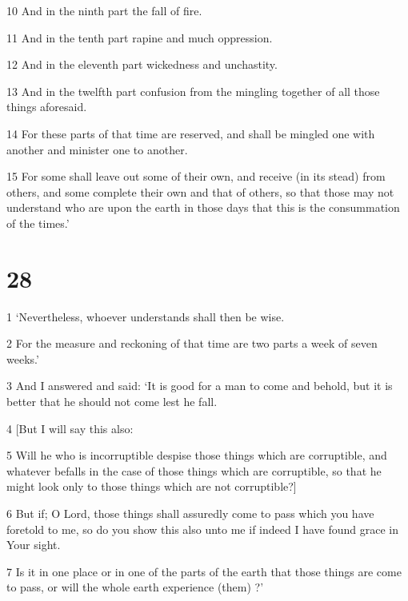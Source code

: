 \par 10 And in the ninth part the fall of fire. 

\par 11 And in the tenth part rapine and much oppression. 

\par 12 And in the eleventh part wickedness and unchastity. 

\par 13 And in the twelfth part confusion from the mingling together of all those things aforesaid. 

\par 14 For these parts of that time are reserved, and shall be mingled one with another and minister one to another. 

\par 15 For some shall leave out some of their own, and receive (in its stead) from others, and some complete their own and that of others, so that those may not understand who are upon the earth in those days that this is the consummation of the times.’

\chapter{28}

\par 1 ‘Nevertheless, whoever understands shall then be wise. 

\par 2 For the measure and reckoning of that time are two parts a week of seven weeks.’ 

\par 3 And I answered and said: ‘It is good for a man to come and behold, but it is better that he should not come lest he fall. 

\par 4 [But I will say this also: 

\par 5 Will he who is incorruptible despise those things which are corruptible, and whatever befalls in the case of those things which are corruptible, so that he might look only to those things which are not corruptible?] 

\par 6 But if; O Lord, those things shall assuredly come to pass which you have foretold to me, so do you show this also unto me if indeed I have found grace in Your sight. 

\par 7 Is it in one place or in one of the parts of the earth that those things are come to pass, or will the whole earth experience (them) ?’

